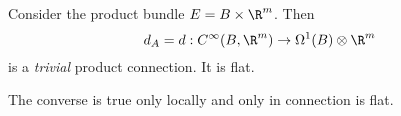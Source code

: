 \documentclass[a4paper]{article}
\begin{document}
\begin{eg}
  Consider the product bundle \(E = B \times \R^m\). Then
  \[
    d_A = d: C^\infty(B, \R^m) \to \Omega^1(B) \otimes \R^m
  \]
  is a \emph{trivial} product connection. It is flat.

  The converse is true only locally and only in connection is flat.
\end{eg}
  
















\printindex
\end{document}

